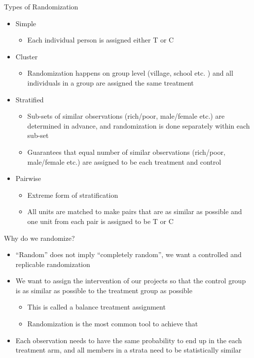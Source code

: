 \documentclass[aspectratio=169]{beamer}
\begin{document}
\begin{frame}{Types of Randomization}
	\begin{itemize}
		\item Simple
		\begin{itemize}
			\item Each individual person is assigned either T or C
		\end{itemize}
		\item Cluster
		\begin{itemize}
			\item Randomization happens on group level (village, school etc. ) and all individuals in a group are assigned the same treatment
		\end{itemize}
		\item Stratified
		\begin{itemize}
			\item Sub-sets of similar observations (rich/poor, male/female etc.) are determined in advance, and randomization is done separately within each sub-set
			\item Guarantees that equal number of similar observations (rich/poor, male/female etc.) are assigned to be each treatment and control
		\end{itemize}
		\item Pairwise
		\begin{itemize}
			\item Extreme form of stratification
			\item All units are matched to make pairs that are as similar as possible and one unit from each pair is assigned to be T or C
		\end{itemize}
	\end{itemize}
\end{frame}


\begin{frame}{Why do we randomize?}
	\begin{itemize}
		\item “Random” does not imply “completely random”, we want a controlled and replicable randomization
		\item We want to assign the intervention of our projects so that the control group is as similar as possible to the treatment group as possible
		\begin{itemize}
			\item This is called a balance treatment assignment
			\item Randomization is the most common tool to achieve that
		\end{itemize}
		\item Each observation needs to have the same probability to end up in the each treatment arm, and all members in a strata need to be statistically similar
	\end{itemize}
\end{frame}
\end{document}
